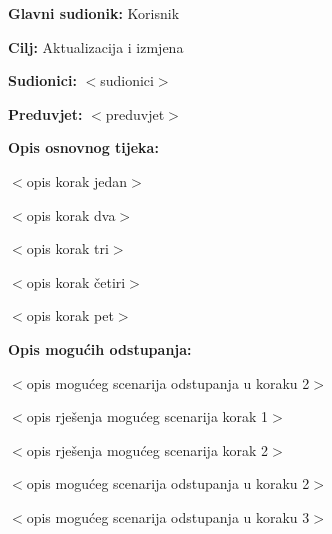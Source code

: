 		
			\noindent {}
			\begin{packed_item}
				
				\item \textbf{Glavni sudionik: }Korisnik
				\item  \textbf{Cilj:} Aktualizacija i izmjena 
				\item  \textbf{Sudionici:} $<$sudionici$>$
				\item  \textbf{Preduvjet:} $<$preduvjet$>$
				\item  \textbf{Opis osnovnog tijeka:}
				
				\item[] \begin{packed_enum}
					
					\item $<$opis korak jedan$>$
					\item $<$opis korak dva$>$
					\item $<$opis korak tri$>$
					\item $<$opis korak četiri$>$
					\item $<$opis korak pet$>$
				\end{packed_enum}
				
				\item  \textbf{Opis mogućih odstupanja:}
				
				\item[] \begin{packed_item}
					
					\item[2.a] $<$opis mogućeg scenarija odstupanja u koraku 2$>$
					\item[] \begin{packed_enum}
						
						\item $<$opis rješenja mogućeg scenarija korak 1$>$
						\item $<$opis rješenja mogućeg scenarija korak 2$>$
						
					\end{packed_enum}
					\item[2.b] $<$opis mogućeg scenarija odstupanja u koraku 2$>$
					\item[3.a] $<$opis mogućeg scenarija odstupanja  u koraku 3$>$
					
				\end{packed_item}
			\end{packed_item}
		

